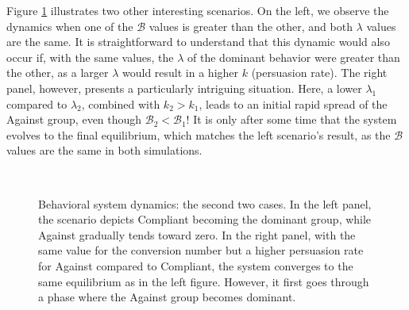 Figure \ref{fig:model__behavior_sim_2} illustrates two other interesting scenarios. On the left, we observe the dynamics when one of the $\mathcal{B}$ values is greater than the other, and both $\lambda$ values are the same. It is straightforward to understand that this dynamic would also occur if, with the same values, the $\lambda$ of the dominant behavior were greater than the other, as a larger $\lambda$ would result in a higher $k$ (persuasion rate). The right panel, however, presents a particularly intriguing situation. Here, a lower $\lambda_1$ compared to $\lambda_2$, combined with $k_2 > k_1$, leads to an initial rapid spread of the Against group, even though $\mathcal{B}_2 < \mathcal{B}_1$! It is only after some time that the system evolves to the final equilibrium, which matches the left scenario's result, as the $\mathcal{B}$ values are the same in both simulations.

\begin{figure}[h]
	\centering
	 \quad
	 \\
		\caption[Behavioural model simulation second]{Behavioral system dynamics: the second two cases. In the left panel, the scenario depicts Compliant becoming the dominant group, while Against gradually tends toward zero. In the right panel, with the same value for the conversion number but a higher persuasion rate for Against compared to Compliant, the system converges to the same equilibrium as in the left figure. However, it first goes through a phase where the Against group becomes dominant.}
	\label{fig:model__behavior_sim_2}
\end{figure}

